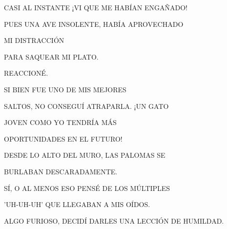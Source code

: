 \documentclass[20pt,oneside,openright,extrafontsizes,landscape,a5paper]{memoir}
\begin{document}
	
		
	
	

\newpage
{}	
				CASI AL INSTANTE \hspace{.3\textwidth}¡VI QUE ME HABÍAN ENGAÑADO! 
				
				PUES UNA AVE \hspace{.3\textwidth}INSOLENTE, HABÍA APROVECHADO 
				
				MI DISTRACCIÓN 
				
				PARA SAQUEAR 				
				MI PLATO.
				
				REACCIONÉ.
				
			SI BIEN FUE UNO			
			 DE MIS MEJORES		
			 	 
			  SALTOS, NO CONSEGUÍ 			  
			  ATRAPARLA. ¡UN GATO 
			  
			  JOVEN COMO YO TENDRÍA MÁS
			  
			   OPORTUNIDADES EN EL FUTURO! 
			  
			  DESDE LO ALTO DEL MURO, LAS 			  
			  PALOMAS SE
			  
			   BURLABAN DESCARADAMENTE. 
			  
			  SÍ, O AL MENOS ESO PENSÉ DE LOS MÚLTIPLES 
			  
			  'UH-UH-UH' QUE LLEGABAN A MIS OÍDOS.
			  
			   ALGO FURIOSO, DECIDÍ DARLES UNA LECCIÓN DE HUMILDAD.

		
	

%
%	
%			
%			
%			
%			
%			
%			
		
	
	
\end{document}
